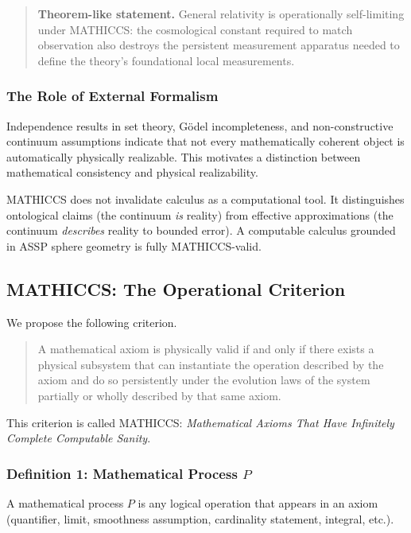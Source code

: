 \documentclass[11pt,a4paper]{article}
\begin{document}
\begin{quote}
\textbf{Theorem-like statement.} General relativity is operationally self-limiting under MATHICCS: the cosmological constant required to match observation also destroys the persistent measurement apparatus needed to define the theory's foundational local measurements.
\end{quote}

\subsubsection{The Role of External Formalism}

Independence results in set theory, Gödel incompleteness, and non-constructive continuum assumptions indicate that not every mathematically coherent object is automatically physically realizable. This motivates a distinction between mathematical consistency and physical realizability.

MATHICCS does not invalidate calculus as a computational tool. It distinguishes ontological claims (the continuum \emph{is} reality) from effective approximations (the continuum \emph{describes} reality to bounded error). A computable calculus grounded in ASSP sphere geometry is fully MATHICCS-valid.

\subsection{MATHICCS: The Operational Criterion}

We propose the following criterion.

\begin{quote}
A mathematical axiom is physically valid if and only if there exists a physical subsystem that can instantiate the operation described by the axiom and do so persistently under the evolution laws of the system partially or wholly described by that same axiom.
\end{quote}

This criterion is called MATHICCS: \emph{Mathematical Axioms That Have Infinitely Complete Computable Sanity}.

\subsubsection{Definition 1: Mathematical Process $P$}

A mathematical process $P$ is any logical operation that appears in an axiom (quantifier, limit, smoothness assumption, cardinality statement, integral, etc.).
\end{document}
